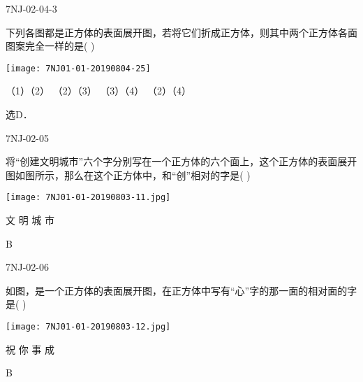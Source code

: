 \begin{defproblem}{7NJ-02-04-3}%
\begin{onlyproblem}%
下列各图都是正方体的表面展开图，若将它们折成正方体，则其中两个正方体各面图案完全一样的是(    ) 
\begin{center}
\texttt{[image: 7NJ01-01-20190804-25]}
\end{center}

\xx
{（1）（2）}
{（2）（3）}
{（3）（4）}
{（2）（4）}
  
\end{onlyproblem}%
\begin{onlysolution}%
\begin{solution}%
选D． 
\end{solution}%
\end{onlysolution}%
\end{defproblem}



\begin{defproblem}{7NJ-02-05}%
\begin{onlyproblem}%
将“创建文明城市”六个字分别写在一个正方体的六个面上，这个正方体的表面展开图如图所示，那么在这个正方体中，和“创”相对的字是(    ) 
\begin{center}
\texttt{[image: 7NJ01-01-20190803-11.jpg]}
\end{center}

\xx
{文}
{明}
{城}
{市}

\end{onlyproblem}%
\begin{onlysolution}%
\begin{solution}%
B
\end{solution}%
\end{onlysolution}%
\end{defproblem}




\begin{defproblem}{7NJ-02-06}%
\begin{onlyproblem}%
如图，是一个正方体的表面展开图，在正方体中写有“心”字的那一面的相对面的字是(    ) 
\begin{center}
\texttt{[image: 7NJ01-01-20190803-12.jpg]}
\end{center}

\xx
{祝}
{你}
{事}
{成}

\end{onlyproblem}%
\begin{onlysolution}%
\begin{solution}%
B
\end{solution}%
\end{onlysolution}%
\end{defproblem}



